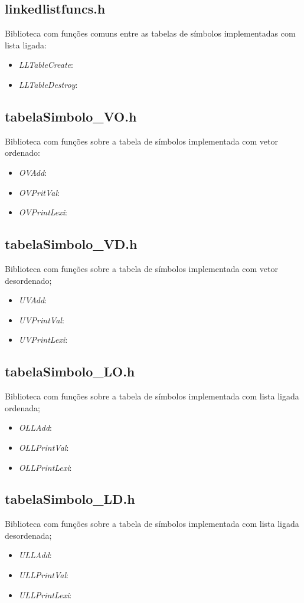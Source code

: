 \documentclass[12pt, a4paper]{article} %
\begin{document}
	\subsection{linkedlistfuncs.h}
		Biblioteca com funções comuns entre as tabelas de símbolos implementadas com lista ligada:
		\begin{itemize}
			\item \textit{LLTableCreate}:
			\item \textit{LLTableDestroy}:
		\end{itemize}
	\subsection{tabelaSimbolo\_VO.h}
		 Biblioteca com funções sobre a tabela de símbolos implementada com vetor ordenado:
		\begin{itemize}
			\item \textit{OVAdd}:
			\item \textit{OVPritVal}:
			\item \textit{OVPrintLexi}:
		\end{itemize}
	\subsection{tabelaSimbolo\_VD.h}
		Biblioteca com funções sobre a tabela de símbolos implementada com vetor desordenado;
		\begin{itemize}
			\item \textit{UVAdd}:
			\item \textit{UVPrintVal}:
			\item \textit{UVPrintLexi}:
		\end{itemize}
	\subsection{tabelaSimbolo\_LO.h}
		Biblioteca com funções sobre a tabela de símbolos implementada com lista ligada ordenada;
		\begin{itemize}
			\item \textit{OLLAdd}:
			\item \textit{OLLPrintVal}:
			\item \textit{OLLPrintLexi}:
		\end{itemize}
	\subsection{tabelaSimbolo\_LD.h}
		Biblioteca com funções sobre a tabela de símbolos implementada com lista ligada desordenada;
		\begin{itemize}
			\item \textit{ULLAdd}:
			\item \textit{ULLPrintVal}:
			\item \textit{ULLPrintLexi}:
		\end{itemize}
\end{document}
